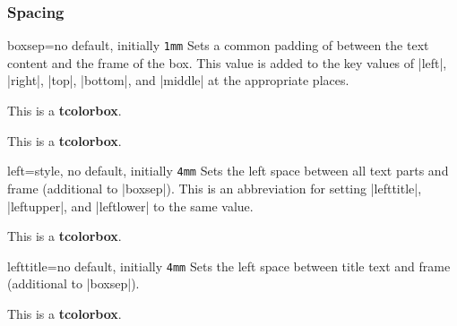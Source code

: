 \subsubsection{Spacing}\enlargethispage*{2cm}
\begin{docTcbKey}{boxsep}{=}{no default, initially \texttt{1mm}}
  Sets a common padding of  between the text content and the
  frame of the box. This value is added to the key values of
  |left|, |right|, |top|, |bottom|, and |middle| at the appropriate places.
\begin{dispExample}

\begin{tcolorbox}[boxsep=5mm]
This is a \textbf{tcolorbox}.
\end{tcolorbox}
\begin{tcolorbox}[boxsep=5mm,draft]
This is a \textbf{tcolorbox}.
\end{tcolorbox}
\end{dispExample}
\end{docTcbKey}

\clearpage


\begin{docTcbKey}{left}{=}{style, no default, initially \texttt{4mm}}
  Sets the left space between all text parts and frame (additional to |boxsep|).
  This is an abbreviation for setting
  |lefttitle|, |leftupper|, and |leftlower| to the same value.
\begin{dispExample}

\begin{tcolorbox}[left=0mm]
This is a \textbf{tcolorbox}.
\end{tcolorbox}
\end{dispExample}
\end{docTcbKey}

\begin{docTcbKey}{lefttitle}{=}{no default, initially \texttt{4mm}}
  Sets the left space between title text and frame (additional to |boxsep|).
\begin{dispExample}

\begin{tcolorbox}[lefttitle=3cm,title=My Title]
This is a \textbf{tcolorbox}.
\end{tcolorbox}
\end{dispExample}
\end{docTcbKey}



